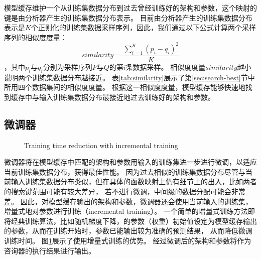 模型缓存维护一个从训练集数据分布到过去曾经训练好的{\rmi}架构和参数，这个映射的键是由分析器产生的训练集数据分布表示。
目前由分析器产生的训练集数据分布表示是$K$个正则化的训练集数据采样序列，因此，我们通过以下公式计算两个采样序列的相似度度量：
\[
  similarity = \frac{ \sum_{i=1}^{K} (p_i - q_i)^2 }{ K }
\]
，其中$p_i$与$q_i$分别为采样序列$P$与$Q$的第$i$条数据采样。
相似度度量$similarity$越小说明两个训练集数据分布越接近。
表\ref{tab:similarity}展示了第\ref{sec:search-best}节中所用四个数据集间的相似度度量。
根据这一相似度度量，模型缓存能够快速地找到缓存中与输入训练集数据分布最接近地过去训练好的{\rmi}架构和参数。


\subsection{微调器}

\begin{figure}[!htp]
  \centering
    {Training time reduction with incremental training}
  \label{fig:fine-tuner}
\end{figure}

微调器将在模型缓存中匹配的{\rmi}架构和参数用输入的训练集进一步进行微调，以适应当前训练集数据分布，获得最佳性能。
因为过去相似的训练集数据分布尽管与当前输入训练集数据分布类似，但在具体的函数映射上仍有细节上的出入，比如两者的搜索键范围可能有较大差异，
若不进行微调，{\rmi}中间级{\model}的数据分配可能会非常差。
因此，对模型缓存输出的{\rmi}架构和参数，微调器还会使用当前输入的训练集，增量式地对{\model}参数进行训练（incremental training）。
一个简单的增量式训练方法即将经典训练算法，比如随机梯度下降，的参数（权重）初始值设定为模型缓存输出的参数，从而在训练开始时，参数已能输出较为准确的预测结果，
从而降低微调训练时间。
图\ref{fig:fine-tuner}展示了使用增量式训练的优势。
经过微调后的{\rmi}架构和参数将作为咨询器的执行结果进行输出。

